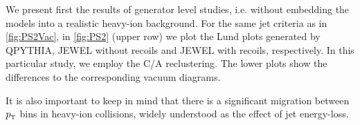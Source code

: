 
We present first the results of generator level studies, i.e. without embedding the models into a realistic heavy-ion background.
For the same jet criteria as in \autoref{fig:PS2Vac}, in \autoref{fig:PS2} (upper row) we plot the Lund plots generated by QPYTHIA, JEWEL without recoils and JEWEL with recoils, respectively. 
In this particular study, we employ the C/A reclustering. 
The lower plots show the differences to the corresponding vacuum diagrams. 

It is also important to keep in mind that there is a significant migration between $p_{\text{\tiny T}}$ bins in heavy-ion collisions, widely understood as the effect of jet energy-loss.

